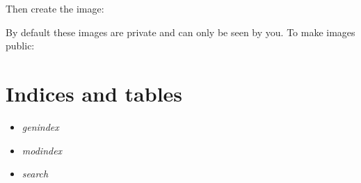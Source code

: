 \documentclass[letterpaper,10pt,english]{sphinxmanual}
\begin{document}
Then create the image:
\begin{quote}

\end{quote}

By default these images are private and can only be seen by you. To make images public:
\begin{quote}

\end{quote}


\chapter{Indices and tables}
\label{index:indices-and-tables}\begin{itemize}
\item {} 
\emph{genindex}

\item {} 
\emph{modindex}

\item {} 
\emph{search}

\end{itemize}



\renewcommand{\indexname}{Index}
\printindex
\end{document}
